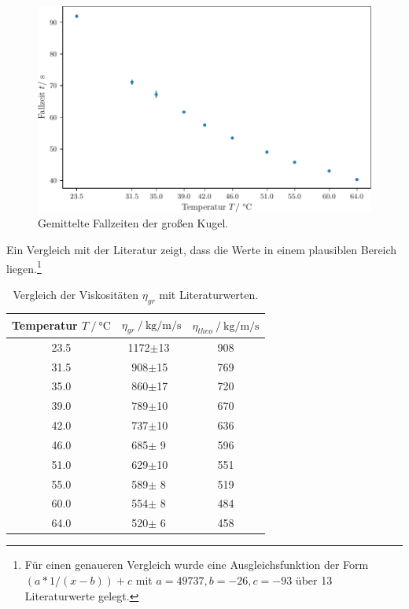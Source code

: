 \begin{figure}
    \centering
    \includegraphics{plots/avg_gr.pdf}
    \caption{Gemittelte Fallzeiten der großen Kugel.}
    \label{fig:mittl_fall_gr}
\end{figure}

Ein Vergleich mit der Literatur\cite{taschenbuch} zeigt, dass die Werte in einem plausiblen Bereich liegen.\footnote{Für einen genaueren Vergleich wurde eine Ausgleichsfunktion der Form $(a * 1/(x-b)) + c$ mit $a = 49737, b = -26, c = -93$ über 13 Literaturwerte gelegt.}

\begin{table}[h]
    \centering
    \caption{Vergleich der Viskositäten $\eta_{gr}$ mit Literaturwerten.}
    \label{tab:mess_grKugel_theo}
    \begin{tabular}{c l c}
        \toprule
        {Temperatur $T\:/\:\si{\celsius}$} & {$\eta_{gr}\:/\:\si{\kilo\gram\per\meter\per\second}$} & {$\eta_{theo}\:/\:\si{\kilo\gram\per\meter\per\second}$} \\
        \midrule
        23.5 & $\:$   1172$\pm$13 & 908 \\
        31.5 & $\;\;$  908$\pm$15 & 769 \\
        35.0 & $\;\;$  860$\pm$17 & 720 \\
        39.0 & $\;\;$  789$\pm$10 & 670 \\
        42.0 & $\;\;$  737$\pm$10 & 636 \\
        46.0 & $\;\;$  685$\pm$ 9 & 596 \\
        51.0 & $\;\;$  629$\pm$10 & 551 \\
        55.0 & $\;\;$  589$\pm$ 8 & 519 \\
        60.0 & $\;\;$  554$\pm$ 8 & 484 \\
        64.0 & $\;\;$  520$\pm$ 6 & 458 \\
        \bottomrule
    \end{tabular}    
\end{table}

